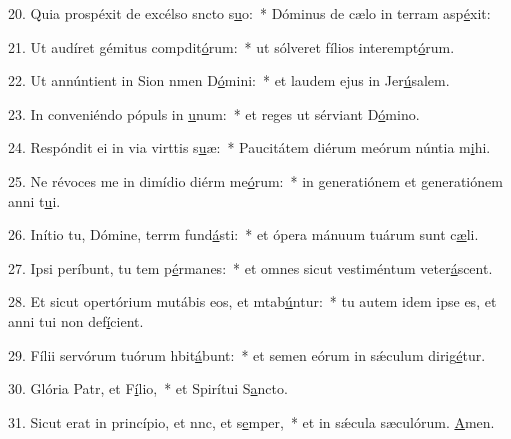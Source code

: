 20. Quia prospéxit de excélso sncto s\uline{u}o:~* Dóminus de cælo in terram asp\uline{é}xit:\par 
21. Ut audíret gémitus compdit\uline{ó}rum:~* ut sólveret fílios interempt\uline{ó}rum.\par 
22. Ut annúntient in Sion nmen D\uline{ó}mini:~* et laudem ejus in Jer\uline{ú}salem.\par 
23. In conveniéndo pópuls in \uline{u}num:~* et reges ut sérviant D\uline{ó}mino.\par 
24. Respóndit ei in via virttis s\uline{u}æ:~* Paucitátem diérum meórum núntia m\uline{i}hi.\par 
25. Ne révoces me in dimídio diérm me\uline{ó}rum:~* in generatiónem et generatiónem anni t\uline{u}i.\par 
26. Inítio tu, Dómine, terrm fund\uline{á}sti:~* et ópera mánuum tuárum sunt c\uline{æ}li.\par 
27. Ipsi períbunt, tu tem p\uline{é}rmanes:~* et omnes sicut vestiméntum veter\uline{á}scent.\par 
28. Et sicut opertórium mutábis eos, et mtab\uline{ú}ntur:~* tu autem idem ipse es, et anni tui non def\uline{í}cient.\par 
29. Fílii servórum tuórum hbit\uline{á}bunt:~* et semen eórum in sǽculum dirig\uline{é}tur.\par 
30. Glória Patr, et F\uline{í}lio,~* et Spirítui S\uline{a}ncto.\par 
31. Sicut erat in princípio, et nnc, et s\uline{e}mper,~* et in sǽcula sæculórum. \uline{A}men.\par 
